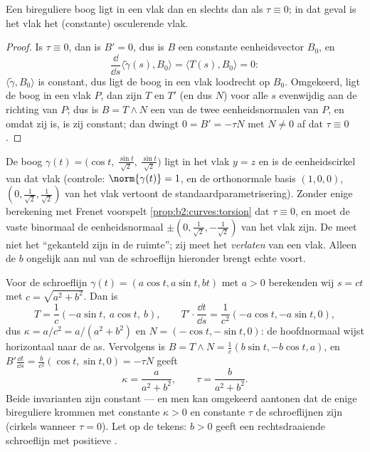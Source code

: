 \begin{proposition}\label{prop:b2:curves:torsion}
Een bireguliere boog ligt in een vlak dan en slechts dan als $\tau
\equiv 0$; in dat geval is het vlak het (constante) osculerende
vlak.
\end{proposition}

\begin{proof}
Is $\tau \equiv 0$, dan is $B' = 0$, dus is $B$ een constante
eenheidsvector $B_0$, en
\[
\frac{\dd}{\dd s}\langle \tilde\gamma(s), B_0\rangle
= \langle T(s), B_0\rangle = 0 :
\]
$\langle \tilde\gamma, B_0\rangle$ is constant, dus ligt de boog in
een vlak loodrecht op $B_0$. Omgekeerd, ligt de boog in een vlak
$P$, dan zijn $T$ en $T'$ (en dus $N$) voor alle $s$ evenwijdig aan
de richting van $P$; dus is $B = T \wedge N$ een van de twee
eenheidsnormalen van $P$, en omdat zij  is, is zij constant;
dan dwingt $0 = B' = -\tau N$ met $N \neq 0$ af dat $\tau \equiv
0$.
\end{proof}

\begin{example}
De boog $\gamma(t) = \bigl(\cos t,\ \tfrac{\sin t}{\sqrt2},\
\tfrac{\sin t}{\sqrt2}\bigr)$ ligt in het vlak $y = z$ en is de
eenheidscirkel van dat vlak (controle: $\norm{\gamma(t)} = 1$, en
de orthonormale basis $(1,0,0)$, $(0, \tfrac1{\sqrt2},
\tfrac1{\sqrt2})$ van het vlak vertoont de standaardparametrisering).
Zonder enige berekening met Frenet voorspelt
\cref{prop:b2:curves:torsion} dat $\tau \equiv 0$, en moet de vaste
binormaal de eenheidsnormaal $\pm(0, \tfrac1{\sqrt2},
-\tfrac1{\sqrt2})$ van het vlak zijn. De  meet niet het
``gekanteld zijn in de ruimte''; zij meet het \emph{verlaten} van
een vlak. Alleen de $b$ ongelijk aan nul van de schroeflijn
hieronder brengt echte  voort.
\end{example}

\begin{example}[De schroeflijn]\label{ex:b2:curves:helixfrenet}
Voor de schroeflijn $\gamma(t) = (a\cos t, a\sin t, bt)$ met $a >
0$ berekenden wij $s = ct$ met $c = \sqrt{a^2 + b^2}$. Dan is
\[
T = \frac1c(-a\sin t,\ a\cos t,\ b),
\qquad
T' \cdot \frac{\dd t}{\dd s}
= \frac{1}{c^2}(-a\cos t, -a\sin t, 0),
\]
dus $\kappa = a/c^2 = a/(a^2 + b^2)$ en $N = (-\cos t, -\sin t,
0)$: de hoofdnormaal wijst horizontaal naar de as. Vervolgens is $B
= T \wedge N = \frac1c(b\sin t, -b\cos t, a)$, en $B' \frac{\dd
t}{\dd s} = \frac{b}{c^2}(\cos t, \sin t, 0) = -\tau N$ geeft
\[
\boxed{\ \kappa = \frac{a}{a^2 + b^2}, \qquad
\tau = \frac{b}{a^2 + b^2}. \ }
\]
Beide invarianten zijn constant --- en men kan omgekeerd aantonen
dat de enige bireguliere krommen met constante $\kappa > 0$ en
constante $\tau$ de schroeflijnen zijn (cirkels wanneer $\tau =
0$). Let op de tekens: $b > 0$ geeft een rechtsdraaiende
schroeflijn met positieve .
\end{example}

